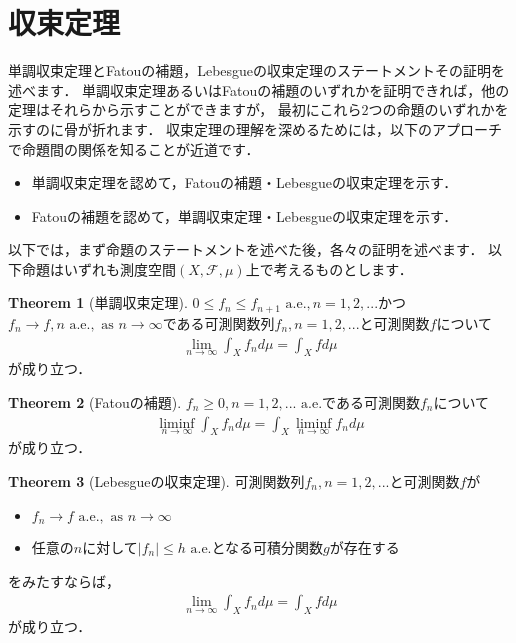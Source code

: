 \documentclass[a4paper,10pt]{jsarticle}
\theoremstyle{definition}
\newtheorem{theorem}{Theorem}
\newcommand{\eq}[1]{\begin{align}#1\end{align}}
\newcommand{\items}[1]{\begin{itemize}#1\end{itemize}}
\begin{document}
\section{収束定理}
単調収束定理とFatouの補題，Lebesgueの収束定理のステートメントその証明を述べます．
単調収束定理あるいはFatouの補題のいずれかを証明できれば，他の定理はそれらから示すことができますが，
最初にこれら$2$つの命題のいずれかを示すのに骨が折れます．
収束定理の理解を深めるためには，以下のアプローチで命題間の関係を知ることが近道です．
\items{
	\item 単調収束定理を認めて，Fatouの補題・Lebesgueの収束定理を示す．
	\item Fatouの補題を認めて，単調収束定理・Lebesgueの収束定理を示す．}
以下では，まず命題のステートメントを述べた後，各々の証明を述べます．
以下命題はいずれも測度空間$(X,\mathcal{F},\mu)$上で考えるものとします．

\begin{theorem}[単調収束定理]
$0\le f_n\le f_{n+1}\text{ a.e.}, n=1,2,...$かつ$f_n\rightarrow f,n\text{ a.e.},\text{ as }n\rightarrow\infty$である可測関数列$f_n,n=1,2,...$と可測関数$f$について
\eq{\lim_{n\rightarrow\infty}\int_X f_nd\mu=\int_Xfd\mu}
が成り立つ．
\end{theorem}\begin{theorem}[Fatouの補題]
$f_n\ge0,n=1,2,...\text{ a.e.}$である可測関数$f_n$について
\eq{\liminf_{n\rightarrow\infty}\int_Xf_nd\mu=\int_X\liminf_{n\rightarrow\infty}f_nd\mu}
が成り立つ．
\end{theorem}\begin{theorem}[Lebesgueの収束定理]
可測関数列$f_n,n=1,2,...$と可測関数$f$が
\items{
	\item $f_n\rightarrow f\text{ a.e.},\text{ as }n\rightarrow\infty$
	\item 任意の$n$に対して$|f_n|\le h\text{ a.e.}$となる可積分関数$g$が存在する}
をみたすならば，
\eq{\lim_{n\rightarrow\infty}\int_X f_nd\mu=\int_Xfd\mu}
が成り立つ．
\end{theorem}
\end{document}
